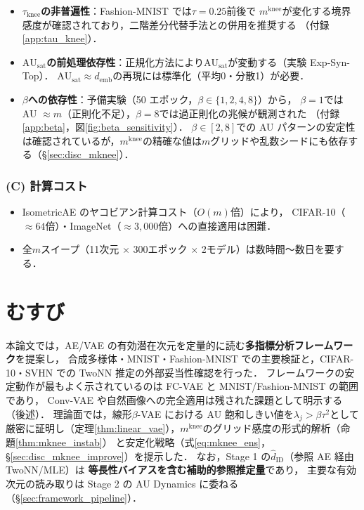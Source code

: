 \documentclass[11pt,a4paper]{jsarticle}
\newcommand{\AUsat}{\mathrm{AU}_{\mathrm{sat}}}
\newcommand{\mknee}{m^{\mathrm{knee}}}
\newcommand{\demb}{d_{\mathrm{emb}}}
\begin{document}
\begin{itemize}
  \item \textbf{$\tau_{\mathrm{knee}}$の非普遍性}：Fashion-MNIST では$\tau = 0.25$前後で
        $\mknee$が変化する境界感度が確認されており，二階差分代替手法との併用を推奨する
        （付録\ref{app:tau_knee}）．
  \item \textbf{$\AUsat$の前処理依存性}：正規化方法により$\AUsat$が変動する（実験 Exp-Syn-Top）．
        $\AUsat \approx \demb$の再現には標準化（平均0・分散1）が必要．
  \item \textbf{$\beta$への依存性}：予備実験（50 エポック，$\beta \in \{1,2,4,8\}$）から，
        $\beta = 1$では AU $\approx m$（正則化不足），$\beta = 8$では過正則化の兆候が観測された
        （付録\ref{app:beta}，図\ref{fig:beta_sensitivity}）．
        $\beta \in [2, 8]$での AU パターンの安定性は確認されているが，$\mknee$の精確な値は$m$グリッドや乱数シードにも依存する（§\ref{sec:disc_mknee}）．
\end{itemize}

\subsubsection*{(C) 計算コスト}

\begin{itemize}
  \item IsometricAE のヤコビアン計算コスト（$O(m)$倍）により，
        CIFAR-10（$\approx 64$倍）・ImageNet（$\approx 3{,}000$倍）への直接適用は困難．
  \item 全$m$スイープ（11次元 $\times$ 300エポック $\times$ 2モデル）は数時間〜数日を要する．
\end{itemize}

\section{むすび}\label{sec:conclusion}

本論文では，AE/VAE の有効潜在次元を定量的に読む\textbf{多指標分析フレームワーク}を提案し，
合成多様体・MNIST・Fashion-MNIST での主要検証と，CIFAR-10・SVHN での TwoNN 推定の外部妥当性確認を行った．
フレームワークの安定動作が最もよく示されているのは FC-VAE と MNIST/Fashion-MNIST の範囲であり，
Conv-VAE や自然画像への完全適用は残された課題として明示する（後述）．
理論面では，線形$\beta$-VAE における AU 飽和しきい値を$\lambda_j > \beta\tau^2$として
厳密に証明し（定理\ref{thm:linear_vae}），$\mknee$のグリッド感度の形式的解析（命題\ref{thm:mknee_instab}）
と安定化戦略（式\eqref{eq:mknee_ens}，§\ref{sec:disc_mknee_improve}）を提示した．
なお，Stage 1 の$\hat{d}_\mathrm{ID}$（参照 AE 経由 TwoNN/MLE）は
\textbf{等長性バイアスを含む補助的参照推定量}であり，
主要な有効次元の読み取りは Stage 2 の AU Dynamics に委ねる（§\ref{sec:framework_pipeline}）．
\end{document}

